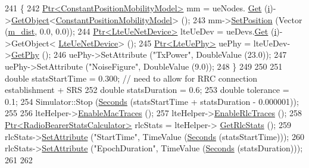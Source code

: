 \begin{DoxyCode}
241     \{
242       \hyperlink{classns3_1_1Ptr}{Ptr<ConstantPositionMobilityModel>} mm = ueNodes.
      \hyperlink{classns3_1_1NodeContainer_a9ed96e2ecc22e0f5a3d4842eb9bf90bf}{Get} (\hyperlink{bernuolliDistribution_8m_a6f6ccfcf58b31cb6412107d9d5281426}{i})->\hyperlink{classns3_1_1Object_a13e18c00017096c8381eb651d5bd0783}{GetObject}<\hyperlink{classns3_1_1ConstantPositionMobilityModel}{ConstantPositionMobilityModel}> ();
243       mm->\hyperlink{classns3_1_1MobilityModel_ac584b3d5a309709d2f13ed6ada1e7640}{SetPosition} (Vector (\hyperlink{classLenaFdMtFfMacSchedulerTestCase_a10d998134a542e3dc4a5d22f80a786b2}{m\_dist}, 0.0, 0.0));
244       \hyperlink{classns3_1_1Ptr}{Ptr<LteUeNetDevice>} lteUeDev = ueDevs.\hyperlink{classns3_1_1NetDeviceContainer_a677d62594b5c9d2dea155cc5045f4d0b}{Get} (\hyperlink{bernuolliDistribution_8m_a6f6ccfcf58b31cb6412107d9d5281426}{i})->GetObject<
      \hyperlink{classns3_1_1LteUeNetDevice}{LteUeNetDevice}> ();
245       \hyperlink{classns3_1_1Ptr}{Ptr<LteUePhy>} uePhy = lteUeDev->\hyperlink{classns3_1_1LteUeNetDevice_a2a9940a1e457a8bf3dae87fed4199c7a}{GetPhy} ();
246       uePhy->SetAttribute (\textcolor{stringliteral}{"TxPower"}, DoubleValue (23.0));
247       uePhy->SetAttribute (\textcolor{stringliteral}{"NoiseFigure"}, DoubleValue (9.0));
248     \}
249 
250 
251   \textcolor{keywordtype}{double} statsStartTime = 0.300; \textcolor{comment}{// need to allow for RRC connection establishment + SRS}
252   \textcolor{keywordtype}{double} statsDuration = 0.6;
253   \textcolor{keywordtype}{double} tolerance = 0.1;
254   Simulator::Stop (\hyperlink{group__timecivil_ga33c34b816f8ff6628e33d5c8e9713b9e}{Seconds} (statsStartTime + statsDuration - 0.000001));
255 
256   lteHelper->\hyperlink{classns3_1_1LteHelper_affa3a12841520407d3662417fe41863d}{EnableMacTraces} ();
257   lteHelper->\hyperlink{classns3_1_1LteHelper_abadfdd04d30b261e9b6f0846b4784928}{EnableRlcTraces} ();
258   \hyperlink{classns3_1_1Ptr}{Ptr<RadioBearerStatsCalculator>} rlcStats = lteHelper->
      \hyperlink{classns3_1_1LteHelper_a6eb438ccf69642e3863adea4991fa2ca}{GetRlcStats} ();
259   rlcStats->\hyperlink{classns3_1_1ObjectBase_ac60245d3ea4123bbc9b1d391f1f6592f}{SetAttribute} (\textcolor{stringliteral}{"StartTime"}, TimeValue (\hyperlink{group__timecivil_ga33c34b816f8ff6628e33d5c8e9713b9e}{Seconds} (statsStartTime)));
260   rlcStats->\hyperlink{classns3_1_1ObjectBase_ac60245d3ea4123bbc9b1d391f1f6592f}{SetAttribute} (\textcolor{stringliteral}{"EpochDuration"}, TimeValue (\hyperlink{group__timecivil_ga33c34b816f8ff6628e33d5c8e9713b9e}{Seconds} (statsDuration)));
261 
262 

\end{DoxyCode}
